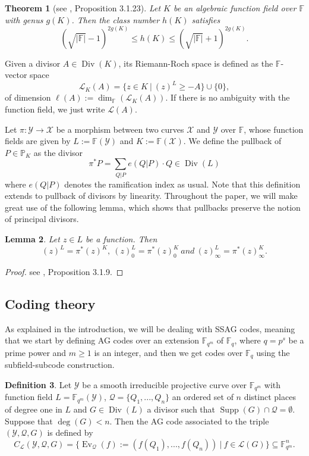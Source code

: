 \documentclass[10pt]{article}
\newtheorem{thm}{Theorem}
\newtheorem{lem1}[thm]{Lemma}
\theoremstyle{definition}
\theoremstyle{definition}
\theoremstyle{definition}
\newtheorem{def1}[thm]{Definition}
\newcommand{\cd}{\cdot}
\newcommand{\F}{\mathbb{F}}
\newcommand{\PP}{\mathbb{P}}
\newcommand{\Fqm}{\mathbb{F}_{q^m}}
\newcommand{\Fq}{\mathbb{F}_q}
\newcommand{\su}{\subseteq}
\newcommand{\X}{\mathcal{X}}
\newcommand{\Y}{\mathcal{Y}}
\newcommand{\QR}{\mathcal{Q}}
\newcommand{\Div}{\operatorname{Div}}
\newcommand{\Supp}{\operatorname{Supp}}
\newcommand{\calL}{\mathcal{L}}
\begin{document}
\begin{thm}[see \cite{Tsf}, Proposition 3.1.23]\label{esti h(X)}
Let $K$ be an algebraic function field over $\F$ with genus $g(K)$. Then the class number $h(K)$ satisfies
\[ (\sqrt{|\F|}-1)^{2g(K)} \leq h(K) \leq (\sqrt{|\F|}+1)^{2g(K)}.\]
\end{thm}

Given a divisor $A \in \Div(K)$, its Riemann-Roch space is defined as the $\F$-vector space
\[\calL_K(A) = \{z \in K \ | \ (z)^L \geq -A\} \cup \{0\},\]
of dimension $\ell(A):= \dim_{\F}(\calL_K(A))$. If there is no ambiguity with the function field, we just write $\calL(A)$.

Let $\pi : \Y \rightarrow \X$ be a morphism between two curves $\X$ and $\Y$ over $\F$, whose function fields are given by $L := \F(\Y)$ and $K:=\F(\X)$. We define the pullback of $P \in \PP_K$ as the divisor
\[\pi^{*}P = \sum\limits_{Q|P} e(Q|P) \cd Q \in \Div(L)\]
where $e(Q|P)$ denotes the ramification index as usual.
Note that this definition extends to pullback of divisors by linearity.
Throughout the paper, we will make great use of the following lemma, which shows that pullbacks preserve the notion of principal divisors.

\begin{lem1} \label{tirarr}
Let $z \in L$ be a function. Then 
\[(z)^L = \pi^*(z)^K, \ (z)^L_0 = \pi^*(z)_0^K \ and \ (z)^L_{\infty} = \pi^*(z)^K_{\infty}.\]
\end{lem1} 

\begin{proof}
see \cite{Sti}, Proposition 3.1.9.
\end{proof}


\subsection{Coding theory}


As explained in the introduction, we will be dealing with SSAG codes, meaning that we start by defining AG codes over an extension $\Fqm$ of $\Fq$, where $q=p^s$ be a prime power and $m \geq 1$ is an integer,
and then we get codes over $\Fq$ using the subfield-subcode construction.

\begin{def1} \label{defagcode}
Let $\Y$ be a smooth irreducible projective curve over $\Fqm$ with function field $L = \Fqm(\Y)$, $\QR = \{Q_1,...,Q_n\}$ an ordered set of $n$ distinct places of degree one in $L$  and $G \in \Div(L)$ a divisor such that $\Supp(G) \cap \QR = \emptyset$. Suppose that $\deg(G)<n$. Then the AG code associated to the triple $(\Y,\QR,G)$ is defined by
\[C_{\calL}(\Y,\QR,G) = \{ \operatorname{Ev}_{\QR}(f):=(f(Q_1),...,f(Q_n)) \ | \ f \in \calL(G)\} \su \Fqm^n.\]
\end{def1}
\end{document}
